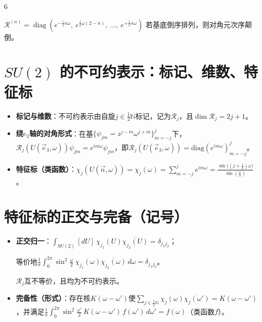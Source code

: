 \documentclass[landscape]{article}
\begin{document}
\begin{multicols*}{6}
\begin{itemize}
  $\mathcal{R}^{(n)} = \operatorname{diag}\left( e^{-\frac{i}{2}n\omega},
  \ e^{\frac{i}{2}\omega(2-n)},\ \dots,\ e^{+\frac{i}{2}n\omega} \right)$
  若基底倒序排列，则对角元次序颠倒。
\end{itemize}
\section*{$SU(2)$ 的不可约表示：标记、维数、特征标}
\begin{itemize}
  \item \textbf{标记与维数}：不可约表示由自旋$j\in\frac12\mathbb{N}$标记，记为$\mathcal R_j$，且$\dim\mathcal R_j=2j+1$。
  \item \textbf{绕$e_3$轴的对角形式}：在基$\{\psi_{jm} = z^{j−m} \omega^{j+m}\}_{m=-j}^{j}$下，$\mathcal R_j(U(\vec e_3,\omega))\psi_{jm}=e^{im\omega}\psi_{jm}$，即$\mathcal R_j(U(\vec e_3,\omega))=\mathrm{diag}(e^{im\omega})_{m=-j}^{j}$。
  \item \textbf{特征标（类函数）}：$\chi_j(U(\vec n,\omega))=\chi_j(\omega)=\sum_{m=-j}^{j}e^{im\omega}=\frac{\sin\big((j+\tfrac12)\omega\big)}{\sin(\tfrac{\omega}{2})}$。
\end{itemize}

\section*{特征标的正交与完备（记号）}
\begin{itemize}
  \item \textbf{正交归一}：$\int_{SU(2)}[dU]\ \chi_{j_1}(U)\overline{\chi_{j_2}(U)}=\delta_{j_1j_2}$；
  
  等价地$\frac{1}{\pi}\int_0^{2\pi}\sin^2\frac{\omega}{2}\ \chi_{j_1}(\omega)\overline{\chi_{j_2}(\omega)}\,d\omega=\delta_{j_1j_2}$。

  $\mathcal R_j$互不等价，且均为不可约表⽰。
  \item \textbf{完备性（形式）}：存在核$K(\omega-\omega')$使$\sum_{j\in\frac12\mathbb{N}}\chi_j(\omega)\overline{\chi_j(\omega')}=K(\omega-\omega')$，并满足$\frac{1}{\pi}\int_0^{2\pi}\sin^2\frac{\omega'}{2}\,K(\omega-\omega')\,f(\omega')\,d\omega'=f(\omega)$（类函数$f$）。
\end{itemize}


\end{multicols*}
\end{document}
